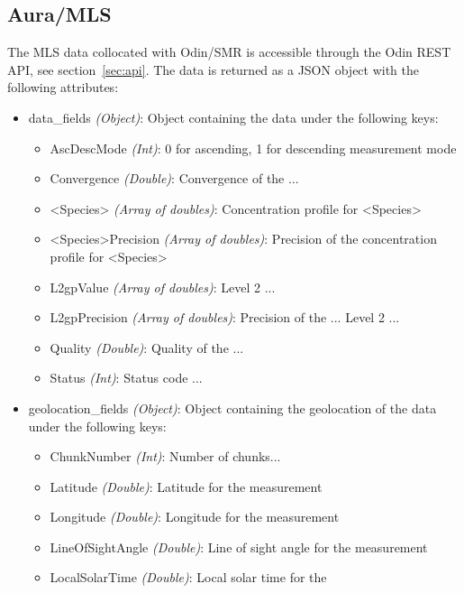\label{sec:dataformat}
\subsection{Aura/MLS}
The MLS data collocated with Odin/SMR is accessible through the Odin REST
API, see section~\ref{sec:api}. The data is returned as a JSON object with the
following attributes:
\begin{itemize}
    \item data\_fields \emph{(Object)}: Object containing the data under the
        following keys:
        \begin{itemize}
            \item AscDescMode \emph{(Int)}: 0 for ascending, 1 for descending
                measurement mode
            \item Convergence \emph{(Double)}: Convergence of the ...
            \item <Species> \emph{(Array of doubles)}: Concentration profile
                for <Species>
            \item <Species>Precision \emph{(Array of doubles)}: Precision of
                the concentration profile for <Species>
            \item L2gpValue \emph{(Array of doubles)}: Level 2 ... 
            \item L2gpPrecision \emph{(Array of doubles)}: Precision of the ...
                Level 2 ... 
            \item Quality \emph{(Double)}: Quality of the ... 
            \item Status \emph{(Int)}: Status code ...
        \end{itemize}
    \item geolocation\_fields \emph{(Object)}: Object containing the
        geolocation of the data under the following keys:
        \begin{itemize}
            \item ChunkNumber \emph{(Int)}: Number of chunks...
            \item Latitude \emph{(Double)}: Latitude for the measurement
            \item Longitude \emph{(Double)}: Longitude for the measurement
            \item LineOfSightAngle \emph{(Double)}: Line of sight angle for the
                measurement
            \item LocalSolarTime \emph{(Double)}: Local solar time for the

\end{itemize}
\end{itemize}
